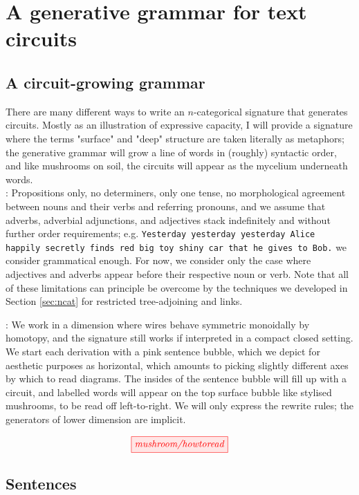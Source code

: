 \section{A generative grammar for text circuits}

\subsection{A circuit-growing grammar}

There are many different ways to write an $n$-categorical signature that generates circuits. Mostly as an illustration of expressive capacity, I will provide a signature where the terms "surface" and "deep" structure are taken literally as metaphors; the generative grammar will grow a line of words in (roughly) syntactic order, and like mushrooms on soil, the circuits will appear as the mycelium underneath words.\\

: Propositions only, no determiners, only one tense, no morphological agreement between nouns and their verbs and referring pronouns, and we assume that adverbs, adverbial adjunctions, and adjectives stack indefinitely and without further order requirements; e.g. \texttt{Yesterday yesterday yesterday Alice happily secretly finds red big toy shiny car that he gives to Bob.} we consider grammatical enough. For now, we consider only the case where adjectives and adverbs appear before their respective noun or verb. Note that all of these limitations can principle be overcome by the techniques we developed in Section \ref{sec:ncat} for restricted tree-adjoining and links.

: We work in a dimension where wires behave symmetric monoidally by homotopy, and the signature still works if interpreted in a compact closed setting. We start each derivation with a pink sentence bubble, which we depict for aesthetic purposes as horizontal, which amounts to picking slightly different axes by which to read diagrams. The insides of the sentence bubble will fill up with a circuit, and labelled words will appear on the top surface bubble like stylised mushrooms, to be read off left-to-right. We will only express the rewrite rules; the generators of lower dimension are implicit.

\[
\tikzfig{mushroom/howtoread}
\]

\subsection{Sentences}

